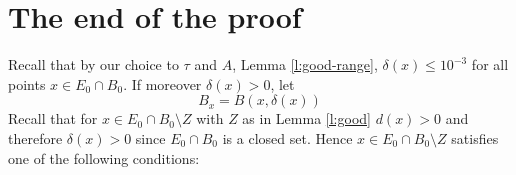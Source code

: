 \documentclass[11pt]{amsart}
\newcommand{\rf}[1]{{(\ref{#1})}}
\newcommand{\ve}{{\varepsilon}}
\newcommand{\vv}{{\vspace{2mm}}}
\theoremstyle{definition}
\theoremstyle{remark}
\numberwithin{equation}{section}
\begin{document}
%
%
%
%

\vv


\section{The end of the proof}\label{end}

Recall that by our choice to $\tau$ and $A$, Lemma \ref{l:good-range}, $\delta(x)\leq 10^{-3}$ for all points $x\in E_{0}\cap B_{0}$.
If moreover $\delta(x)>0$, let 
\begin{equation}\label{def-Bx}
B_{x}= B(x,\delta(x))
\end{equation}
Recall that for $x\in E_{0}\cap B_{0}\setminus Z$ with $Z$ as in Lemma \ref{l:good} $d(x)>0$ and therefore $\delta(x)>0$ since $E_0\cap B_0$ is a closed set. Hence $x\in E_{0}\cap B_{0}\setminus Z$
satisfies one of the following conditions:
\end{document}
